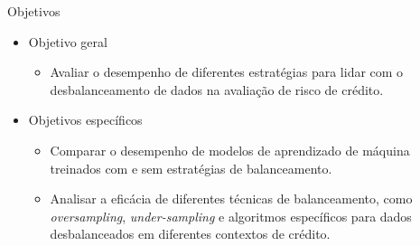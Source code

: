 \begin{frame}{Objetivos}
  \begin{itemize}
    \item[$\blacktriangleright$] Objetivo geral
      \begin{itemize}
        \item Avaliar o desempenho de diferentes estratégias para lidar com o desbalanceamento de dados na avaliação de risco de crédito.
      \end{itemize}
    \item[$\blacktriangleright$] Objetivos específicos
      \begin{itemize}
        \item Comparar o desempenho de modelos de aprendizado de máquina treinados com e sem estratégias de balanceamento.
        \item Analisar a eficácia de diferentes técnicas de balanceamento, como \textit{oversampling}, \textit{under-sampling} e algoritmos específicos para dados desbalanceados em diferentes contextos de crédito.
      \end{itemize}
  \end{itemize}
\end{frame}
